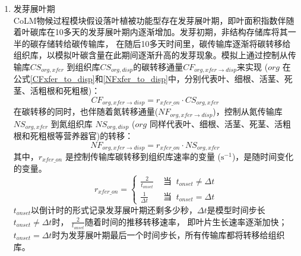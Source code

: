 \begin{enumerate}
\renewcommand{\theenumi}{\alph{enumi}}
\item 发芽展叶期\\
CoLM物候过程模块假设落叶植被功能型存在发芽展叶期，即叶面积指数伴随着叶碳库在10多天的发芽展叶期内逐渐增加。发芽初期，非结构存储库将其一半的碳存储转给碳传输库，
在随后10多天时间里，碳传输库逐渐将碳转移给组织库，以模拟叶碳含量在此期间逐渐升高的发芽现象。模拟上通过控制从传输库$CS_{org,{xfer}}$
到组织库$CS_{org,disp}$的碳转移通量$CF_{org,{xfer}\rightarrow {disp}}$来实现
($org$ 在公式\eqref{CFxfer_to_disp}和\eqref{NFxfer_to_disp}中，分别代表叶、细根、活茎、死茎、活粗根和死粗根)：
\begin{equation}\label{CFxfer_to_disp}
  CF_{org,{xfer}\rightarrow disp} = r_{{xfer}\_{on}}\cdot CS_{org,{xfer}}\ 
\end{equation}
在碳转移的同时，也伴随着氮转移通量($NF_{org,{xfer}\rightarrow disp}$)，控制从氮传输库 $NS_{org,{xfer}}$ 到氮组织库 $NS_{org,disp}$ ($org$ 同样代表叶、细根、活茎、死茎、活粗根和死粗根等营养器官)的转移：
\begin{equation}\label{NFxfer_to_disp}
  NF_{org,{xfer}\rightarrow disp} = r_{{xfer}\_{on}}\cdot NS_{org,{xfer}}\ 
\end{equation}
其中，$r_{{xfer}\_{on}}$ 是控制传输库碳转移到组织库速率的变量 ($\mathrm{s^{-1}}$)，是随时间变化的变量。
\begin{equation}
r_{xfer\_{on}}=\begin{cases}
\frac{2}{t_{ {onset}}} &  \text{ 当 }\ t_{ {onset}} \neq \Delta t \\ 
\frac{1}{\Delta t} &  \text{ 当 }\ t_{onset}=\Delta t
\end{cases}
\end{equation}
$t_{onset}$以倒计时的形式记录发芽展叶期还剩多少秒，$\Delta t$是模型时间步长$t_{onset}\neq\Delta t$时，
$\frac{2}{t_{onset}}$随着时间的推移转移速率，
即叶片生长速率逐渐加快；$t_{onset}=\Delta t$时为发芽展叶期最后一个时间步长，所有传输库都将转移给组织库。


\end{enumerate}
